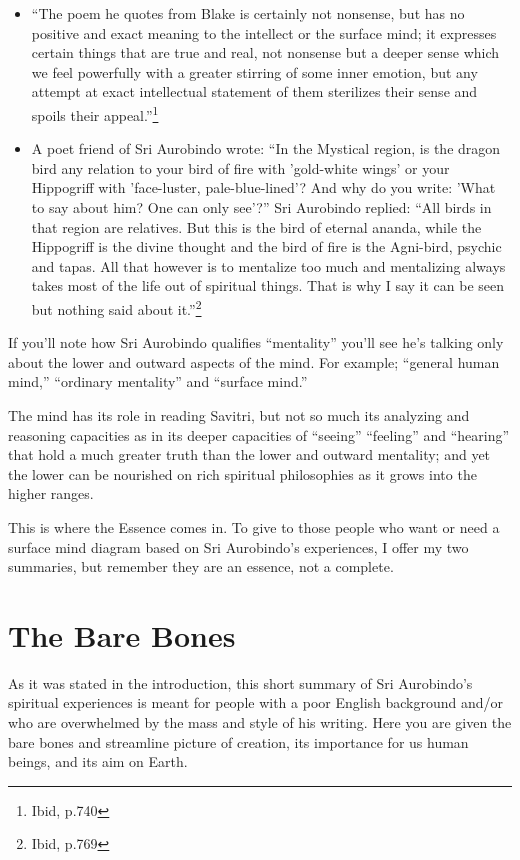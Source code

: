 \documentclass[12pt,a4paper]{book}
\begin{document}
\begin{itemize}
\item ``The poem he quotes from Blake is certainly not nonsense, but
  has no positive and exact meaning to the intellect or the surface
  mind; it expresses certain things that are true and real, not
  nonsense but a deeper sense which we feel powerfully with a greater
  stirring of some inner emotion, but any attempt at exact
  intellectual statement of them sterilizes their sense and spoils
  their appeal.''\footnote{Ibid, p.740}

\item A poet friend of Sri Aurobindo wrote: ``In the Mystical region,
  is the dragon bird any relation to your bird of fire with
  'gold-white wings' or your Hippogriff with 'face-luster,
  pale-blue-lined'? And why do you write: 'What to say about him? One
  can only see'?''  Sri Aurobindo replied: ``All birds in that region
  are relatives. But this is the bird of eternal ananda, while the
  Hippogriff is the divine thought and the bird of fire is the
  Agni-bird, psychic and tapas. All that however is to mentalize too
  much and mentalizing always takes most of the life out of spiritual
  things. That is why I say it can be seen but nothing said about
  it.''\footnote{Ibid, p.769}
\end{itemize}

If you'll note how Sri Aurobindo qualifies ``mentality'' you'll see
he's talking only about the lower and outward aspects of the mind. For
example; ``general human mind,'' ``ordinary mentality'' and ``surface
mind.''

The mind has its role in reading Savitri, but not so much its
analyzing and reasoning capacities as in its deeper capacities of
``seeing'' ``feeling'' and ``hearing'' that hold a much greater truth
than the lower and outward mentality; and yet the lower can be
nourished on rich spiritual philosophies as it grows into the higher
ranges.

This is where the Essence comes in. To give to those people who want
or need a surface mind diagram based on Sri Aurobindo's experiences, I
offer my two summaries, but remember they are an essence, not a
complete.


\newpage
\chapter*{The Bare Bones}


As it was stated in the introduction, this short summary of Sri
Aurobindo's spiritual experiences is meant for people with a poor
English background and/or who are overwhelmed by the mass and style of
his writing. Here you are given the bare bones and streamline picture
of creation, its importance for us human beings, and its aim on Earth.
\end{document}
